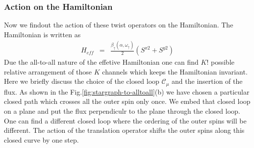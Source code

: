 \documentclass[reprint,prb,superscriptaddress]{revtex4-2}
\begin{document}
\subsubsection{Action on the Hamiltonian}
Now we findout the action of these twist operators on the Hamiltonian. The Hamiltonian is written as 
\begin{eqnarray}
H_{eff}&=& \frac{\beta_{\uparrow}(\alpha,\omega_{\uparrow})}{2} (S^{x2} +S^{y2})   
\end{eqnarray}
Due the all-to-all nature of the effetive Hamiltonian one can find $K!$ possible relative arrangement of those $K$ channels which keeps the Hamiltonian invariant. Here we briefly discuss the choice of the closed loop $\mathcal{C}_{\mu}$ and the insertion of the flux. As shown in the Fig.\ref{fig:stargraph-to-alltoall}(b) we have chosen a particular closed path which crosses all the outer spin only once. We embed that closed loop on a plane and put the flux perpendiculr to the plane through the closed loop. One can find a different closed loop where the ordering of the outer spins will be different. The action of the translation operator shifts the outer spins along this closed curve by one step.
\end{document}
